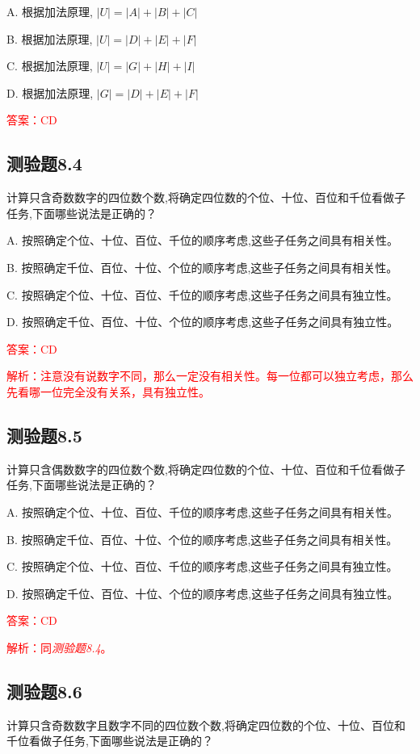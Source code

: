 \documentclass[UTF8, heading=true]{ctexart}
\begin{document}
A. 根据加法原理, $|U|=|A|+|B|+|C|$

B. 根据加法原理, $|U|=|D|+|E|+|F|$

C. 根据加法原理, $|U|=|G|+|H|+|I|$

D. 根据加法原理, $|G|=|D|+|E|+|F|$

\textcolor{red}{答案：CD}
\subsection{测验题8.4}
计算只含奇数数字的四位数个数,将确定四位数的个位、十位、百位和千位看做子任务,下面哪些说法是正确的？

A. 按照确定个位、十位、百位、千位的顺序考虑,这些子任务之间具有相关性。

B. 按照确定千位、百位、十位、个位的顺序考虑,这些子任务之间具有相关性。

C. 按照确定个位、十位、百位、千位的顺序考虑,这些子任务之间具有独立性。

D. 按照确定千位、百位、十位、个位的顺序考虑,这些子任务之间具有独立性。

\textcolor{red}{答案：CD}

\textcolor{red}{解析：注意没有说数字不同，那么一定没有相关性。每一位都可以独立考虑，那么先看哪一位完全没有关系，具有独立性。}


\subsection{测验题8.5}

计算只含偶数数字的四位数个数,将确定四位数的个位、十位、百位和千位看做子任务,下面哪些说法是正确的？

A. 按照确定个位、十位、百位、千位的顺序考虑,这些子任务之间具有相关性。

B. 按照确定千位、百位、十位、个位的顺序考虑,这些子任务之间具有相关性。

C. 按照确定个位、十位、百位、千位的顺序考虑,这些子任务之间具有独立性。

D. 按照确定千位、百位、十位、个位的顺序考虑,这些子任务之间具有独立性。

\textcolor{red}{答案：CD}

\textcolor{red}{解析：同\textit{测验题8.4}。}

\subsection{测验题8.6}

计算只含奇数数字且数字不同的四位数个数,将确定四位数的个位、十位、百位和千位看做子任务,下面哪些说法是正确的？
\end{document}
